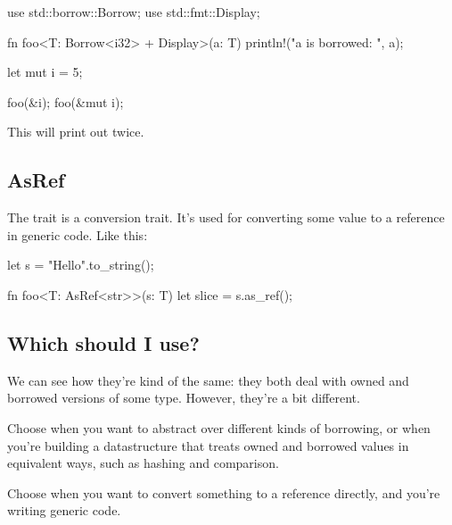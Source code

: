 \begin{rustc}
use std::borrow::Borrow;
use std::fmt::Display;

fn foo<T: Borrow<i32> + Display>(a: T) {
    println!("a is borrowed: {}", a);
}

let mut i = 5;

foo(&i);
foo(&mut i);
\end{rustc}

This will print out  twice.

\subsection*{AsRef}

The  trait is a conversion trait. It's used for converting some value to a reference in generic code. Like this:

\begin{rustc}
let s = "Hello".to_string();

fn foo<T: AsRef<str>>(s: T) {
    let slice = s.as_ref();
}
\end{rustc}

\subsection*{Which should I use?}

We can see how they're kind of the same: they both deal with owned and borrowed versions of some type. However, they're a 
bit different.

\blank

Choose  when you want to abstract over different kinds of borrowing, or when you're building a datastructure 
that treats owned and borrowed values in equivalent ways, such as hashing and comparison.

\blank

Choose  when you want to convert something to a reference directly, and you're writing generic code.
